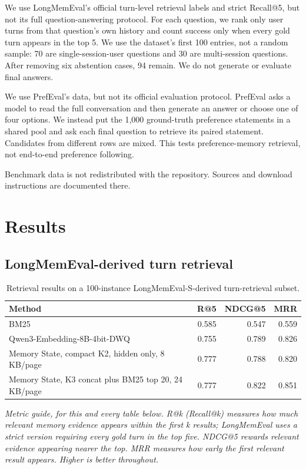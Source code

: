 \documentclass[
  10pt,
  letterpaper,
]{article}
\begin{document}
We use LongMemEval's official turn-level retrieval labels and strict
Recall@5, but not its full question-answering protocol. For each
question, we rank only user turns from that question's own history and
count success only when every gold turn appears in the top 5. We use the
dataset's first 100 entries, not a random sample: 70 are
single-session-user questions and 30 are multi-session questions. After
removing six abstention cases, 94 remain. We do not generate or evaluate
final answers.

We use PrefEval's data, but not its official evaluation protocol.
PrefEval asks a model to read the full conversation and then generate an
answer or choose one of four options. We instead put the 1,000
ground-truth preference statements in a shared pool and ask each final
question to retrieve its paired statement. Candidates from different
rows are mixed. This tests preference-memory retrieval, not end-to-end
preference following.

Benchmark data is not redistributed with the repository. Sources and
download instructions are documented there.

\section{Results}\label{results}

\subsection{LongMemEval-derived turn retrieval}\label{longmemeval}

\begin{table}[htbp]
\centering
\small
\caption{Retrieval results on a 100-instance LongMemEval-S-derived
turn-retrieval subset.}
\label{tab:longmemeval}
\begin{tabularx}{\linewidth}{@{}Xrrr@{}}
\toprule
Method & R@5 & NDCG@5 & MRR \\
\midrule
BM25 & 0.585 & 0.547 & 0.559 \\
Qwen3-Embedding-8B-4bit-DWQ & 0.755 & 0.789 & 0.826 \\
Memory State, compact K2, hidden only, 8 KB/page & 0.777 & 0.788 &
0.820 \\
Memory State, K3 concat plus BM25 top 20, 24 KB/page & 0.777 & 0.822 &
0.851 \\
\bottomrule
\end{tabularx}
\begin{minipage}{\linewidth}
\vspace{3pt}\footnotesize\emph{Metric guide, for this and every table below. R@k (Recall@k)
measures how much relevant memory evidence appears within the first k
results; LongMemEval uses a strict version requiring every gold turn in
the top five. NDCG@5 rewards relevant evidence appearing nearer the top.
MRR measures how early the first relevant result appears. Higher is
better throughout.}
\end{minipage}
\end{table}
\end{document}
